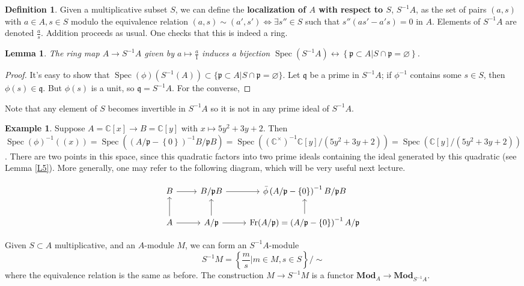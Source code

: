 \documentclass{article}
\newcommand{\C}{\mathbb{C}}
\newcommand{\fr}{\mathfrak}
\DeclareMathOperator{\Spec}{Spec}
\theoremstyle{plain}
\newtheorem{lem}[thm]{Lemma}
\theoremstyle{definition}
\newtheorem{defn}{Definition}
\newtheorem{exmp}{Example}
\theoremstyle{remark}
\begin{document}
\begin{defn}
    Given a multiplicative subset $S$, we can define the \textbf{localization of $A$ with respect to $S$}, $S^{-1}A$, as the set of pairs $(a,s)$ with $a\in A,s\in S$ modulo the equivalence relation
    $(a,s)\sim(a',s')\iff \exists s''\in S$ such that $s''(as'-a's)=0$ in $A$. Elements of $S^{-1}A$ are denoted $\frac{a}{s}$. Addition proceeds
    as usual. One checks that this is indeed a ring.
\end{defn}

\begin{lem}
\label{L7}
    The ring map $A\to S^{-1}A$ given by $a\mapsto \frac{a}{1}$ induces a bijection $\Spec(S^{-1}A)\leftrightarrow\left\{ \fr p\subset A|S\cap \fr p=\varnothing \right\}$.
\end{lem}
\begin{proof}
It's easy to show that $\Spec(\phi) (S^{-1}(A)) \subset \{ \fr p\subset A|S\cap \fr p=\varnothing \}$. Let $\fr q$ be a prime in $S^{-1}A$; if $\phi^{-1}$ contains some $s\in S$, then $\phi(s) \in \fr q$. But $\phi(s)$ is a unit, so $\fr q = S^{-1}A$. For the converse, 
\end{proof}
Note that any element of $S$ becomes invertible in $S^{-1}A$ so it is not in any prime ideal of $S^{-1}A$. 

\begin{exmp}
\label{E3}
    Suppose $A=\C[x]\to B=\C[y]$ with $x\mapsto 5y^2+3y+2$. Then $\Spec(\phi)^{-1}\left( (x) \right)=\Spec\left( (A/\fr p-\left\{ 0 \right\})^{-1} B/\fr p B \right)=\Spec\left( (\C^\times)^{-1}\C[y]/(5y^2+3y+2) \right)=\Spec\left(\C[y]/(5y^2+3y+2) \right)$. There are two points in this space, since this quadratic factors into two prime ideals containing the ideal generated by this quadratic (see Lemma \ref{L5}). More generally, one may refer to the following diagram, which will be very useful next lecture.
\end{exmp}

\[
\begin{tikzcd}
B\arrow{r}&B/\fr pB\arrow{r} & \bar\phi\left(A/\fr p-\{0\}\right)^{-1}B/\fr pB\\
A\arrow{r}\arrow{u} & A/\fr p\arrow{r}\arrow{u}&\text{Fr}(A/\fr p)=\left(A/\fr p-\{0\}\right)^{-1}A/\fr p\arrow{u}
\end{tikzcd}
\]

Given $S\subset A$ multiplicative, and an $A$-module $M$, we can form an $S^{-1}A$-module
\[S^{-1}M=\left\{ \frac{m}{s}|m\in M,s\in S \right\}/\sim\]
where the equivalence relation is the same as before. The construction $M\to S^{-1}M$ is a functor $\mathbf{Mod}_A\to\mathbf{Mod}_{S^{-1}A}$.
\end{document}
